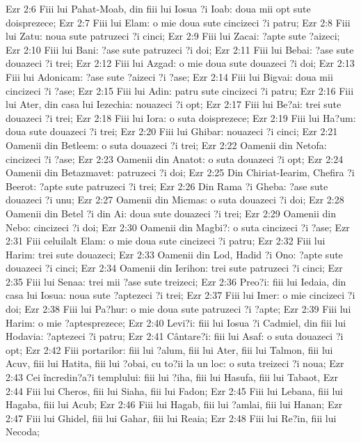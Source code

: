 Ezr 2:6  Fiii lui Pahat-Moab, din fiii lui Iosua ?i Ioab: doua mii opt sute doisprezece;
Ezr 2:7  Fiii lui Elam: o mie doua sute cincizeci ?i patru;
Ezr 2:8  Fiii lui Zatu: noua sute patruzeci ?i cinci;
Ezr 2:9  Fiii lui Zacai: ?apte sute ?aizeci;
Ezr 2:10  Fiii lui Bani: ?ase sute patruzeci ?i doi;
Ezr 2:11  Fiii lui Bebai: ?ase sute douazeci ?i trei;
Ezr 2:12  Fiii lui Azgad: o mie doua sute douazeci ?i doi;
Ezr 2:13  Fiii lui Adonicam: ?ase sute ?aizeci ?i ?ase;
Ezr 2:14  Fiii lui Bigvai: doua mii cincizeci ?i ?ase;
Ezr 2:15  Fiii lui Adin: patru sute cincizeci ?i patru;
Ezr 2:16  Fiii lui Ater, din casa lui Iezechia: nouazeci ?i opt;
Ezr 2:17  Fiii lui Be?ai: trei sute douazeci ?i trei;
Ezr 2:18  Fiii lui Iora: o suta doisprezece;
Ezr 2:19  Fiii lui Ha?um: doua sute douazeci ?i trei;
Ezr 2:20  Fiii lui Ghibar: nouazeci ?i cinci;
Ezr 2:21  Oamenii din Betleem: o suta douazeci ?i trei;
Ezr 2:22  Oamenii din Netofa: cincizeci ?i ?ase;
Ezr 2:23  Oamenii din Anatot: o suta douazeci ?i opt;
Ezr 2:24  Oamenii din Betazmavet: patruzeci ?i doi;
Ezr 2:25  Din Chiriat-Iearim, Chefira ?i Beerot: ?apte sute patruzeci ?i trei;
Ezr 2:26  Din Rama ?i Gheba: ?ase sute douazeci ?i unu;
Ezr 2:27  Oamenii din Micmas: o suta douazeci ?i doi;
Ezr 2:28  Oamenii din Betel ?i din Ai: doua sute douazeci ?i trei;
Ezr 2:29  Oamenii din Nebo: cincizeci ?i doi;
Ezr 2:30  Oamenii din Magbi?: o suta cincizeci ?i ?ase;
Ezr 2:31  Fiii celuilalt Elam: o mie doua sute cincizeci ?i patru;
Ezr 2:32  Fiii lui Harim: trei sute douazeci;
Ezr 2:33  Oamenii din Lod, Hadid ?i Ono: ?apte sute douazeci ?i cinci;
Ezr 2:34  Oamenii din Ierihon: trei sute patruzeci ?i cinci;
Ezr 2:35  Fiii lui Senaa: trei mii ?ase sute treizeci;
Ezr 2:36  Preo?i: fiii lui Iedaia, din casa lui Iosua: noua sute ?aptezeci ?i trei;
Ezr 2:37  Fiii lui Imer: o mie cincizeci ?i doi;
Ezr 2:38  Fiii lui Pa?hur: o mie doua sute patruzeci ?i ?apte;
Ezr 2:39  Fiii lui Harim: o mie ?aptesprezece;
Ezr 2:40  Levi?i: fiii lui Iosua ?i Cadmiel, din fiii lui Hodavia: ?aptezeci ?i patru;
Ezr 2:41  Cântare?i: fiii lui Asaf: o suta douazeci ?i opt;
Ezr 2:42  Fiii portarilor: fiii lui ?alum, fiii lui Ater, fiii lui Talmon, fiii lui Acuv, fiii lui Hatita, fiii lui ?obai, cu to?ii la un loc: o suta treizeci ?i noua;
Ezr 2:43  Cei încredin?a?i templului: fiii lui ?iha, fiii lui Hasufa, fiii lui Tabaot,
Ezr 2:44  Fiii lui Cheros, fiii lui Siaha, fiii lui Fadon;
Ezr 2:45  Fiii lui Lebana, fiii lui Hagaba, fiii lui Acub;
Ezr 2:46  Fiii lui Hagab, fiii lui ?amlai, fiii lui Hanan;
Ezr 2:47  Fiii lui Ghidel, fiii lui Gahar, fiii lui Reaia;
Ezr 2:48  Fiii lui Re?in, fiii lui Necoda;
